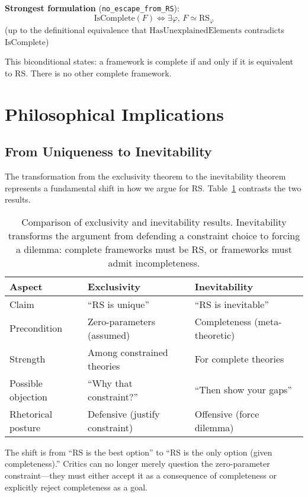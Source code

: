 \documentclass[12pt]{article}
\theoremstyle{remark}
\begin{document}
\textbf{Strongest formulation} (\texttt{no\_escape\_from\_RS}):
\[
\mathrm{IsComplete}(F) \iff \exists \varphi,\, F \simeq \mathrm{RS}_\varphi
\]
(up to the definitional equivalence that $\mathrm{HasUnexplainedElements}$ contradicts $\mathrm{IsComplete}$)

This biconditional states: a framework is complete if and only if it is equivalent to RS. There is no other complete framework.

\section{Philosophical Implications}

\subsection{From Uniqueness to Inevitability}

The transformation from the exclusivity theorem to the inevitability theorem represents a fundamental shift in how we argue for RS. Table~\ref{tab:comparison} contrasts the two results.

\begin{table}[t]
\centering
\begin{tabular}{@{}lll@{}}
\toprule
Aspect & Exclusivity & Inevitability \\
\midrule
Claim & ``RS is unique'' & ``RS is inevitable'' \\
Precondition & Zero-parameters (assumed) & Completeness (meta-theoretic) \\
Strength & Among constrained theories & For complete theories \\
Possible objection & ``Why that constraint?'' & ``Then show your gaps'' \\
Rhetorical posture & Defensive (justify constraint) & Offensive (force dilemma) \\
\bottomrule
\end{tabular}
\caption{Comparison of exclusivity and inevitability results. Inevitability transforms the argument from defending a constraint choice to forcing a dilemma: complete frameworks must be RS, or frameworks must admit incompleteness.}
\label{tab:comparison}
\end{table}

The shift is from ``RS is the best option'' to ``RS is the only option (given completeness).'' Critics can no longer merely question the zero-parameter constraint---they must either accept it as a consequence of completeness or explicitly reject completeness as a goal.
\end{document}
